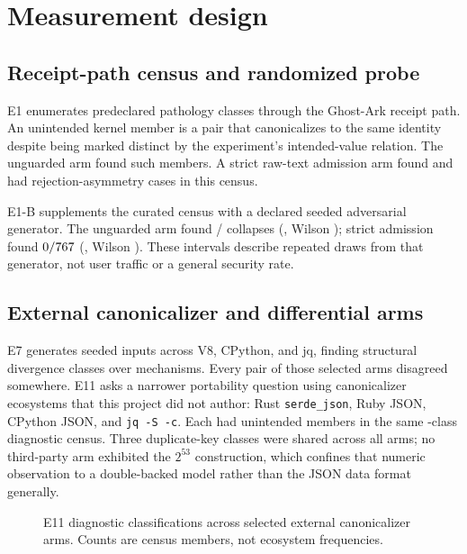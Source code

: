 \documentclass[10pt,twocolumn,letterpaper]{article}
\newcommand{\ghostark}{Ghost-Ark}
\begin{document}
\section{Measurement design}
\label{sec:design}

\subsection{Receipt-path census and randomized probe}

E1 enumerates \pnEOneClasses{} predeclared pathology classes through the
\ghostark{} receipt path.  An unintended kernel member is a pair that
canonicalizes to the same identity despite being marked distinct by the
experiment's intended-value relation.  The unguarded arm found
\pnEOneUnguarded{} such members.  A strict raw-text admission arm found
\pnEOneStrict{} and had \pnEOneStrictAsymmetry{} rejection-asymmetry cases in
this census.

E1-B supplements the curated census with a declared seeded adversarial
generator.  The unguarded arm found \pnEOneBSuccesses{}/\pnEOneBDenominator{}
collapses (\pnEOneBRate{}, Wilson \pnEOneBInterval{}); strict admission found
$0/767{}$ (\pnEOneBStrictRate{}, Wilson
\pnEOneBStrictInterval{}).  These intervals describe repeated draws from that
generator, not user traffic or a general security rate.

\subsection{External canonicalizer and differential arms}

E7 generates \pnESevenInputs{} seeded inputs across V8, CPython, and jq,
finding \pnESevenClasses{} structural divergence classes over
\pnESevenMechanisms{} mechanisms.  Every pair of those selected arms disagreed
somewhere.  E11 asks a narrower portability question using \pnEElevenArms{} canonicalizer
ecosystems that this project did not author: Rust \texttt{serde\_json}, Ruby
JSON, CPython JSON, and \texttt{jq -S -c}.  Each had
\pnEElevenUnintended{} unintended members in the same
\pnEElevenClasses-class diagnostic census.  Three duplicate-key classes were
shared across all arms; no third-party arm exhibited the $2^{53}$ construction,
which confines that numeric observation to a double-backed model rather than
the JSON data format generally.

\begin{figure}[t]
  \centering
  \resizebox{\columnwidth}{!}{}
  \caption{E11 diagnostic classifications across selected external
  canonicalizer arms.  Counts are census members, not ecosystem frequencies.}
  \label{fig:e11}
\end{figure}
\end{document}
